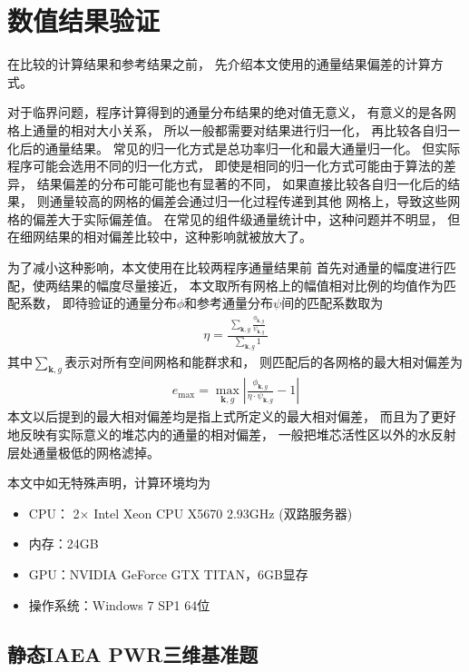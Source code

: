 \section{数值结果验证}

在比较\ProgramName 的计算结果和参考结果之前，
先介绍本文使用的通量结果偏差的计算方式。

对于临界问题，程序计算得到的通量分布结果的绝对值无意义，
有意义的是各网格上通量的相对大小关系，
所以一般都需要对结果进行归一化，
再比较各自归一化后的通量结果。
常见的归一化方式是总功率归一化和最大通量归一化。
但实际程序可能会选用不同的归一化方式，
即使是相同的归一化方式可能由于算法的差异，
结果偏差的分布可能可能也有显著的不同，
如果直接比较各自归一化后的结果，
则通量较高的网格的偏差会通过归一化过程传递到其他
网格上，导致这些网格的偏差大于实际偏差值。
在常见的组件级通量统计中，这种问题并不明显，
但在细网结果的相对偏差比较中，这种影响就被放大了。

为了减小这种影响，本文使用在比较两程序通量结果前
首先对通量的幅度进行匹配，使两结果的幅度尽量接近，
本文取所有网格上的幅值相对比例的均值作为匹配系数，
即待验证的通量分布$\phi$和参考通量分布$\psi$间的匹配系数取为
\begin{align}
  \eta = \frac{\ \displaystyle\sum_{\bm{k},g}\frac{\phi_{\bm{k},g}}{\psi_{\bm{k},g}}\ }
              {\displaystyle\sum_{\bm{k},g}1}
\end{align}
其中$\displaystyle\sum_{\bm{k},g}$表示对所有空间网格和能群求和，
则匹配后的各网格的最大相对偏差为
\begin{align}
  e_\mathrm{max} = \max_{\bm{k},g}
      \left|
        \frac{\phi_{\bm{k},g}}{\eta\cdot\psi_{\bm{k},g}} - 1
      \right|
\end{align}
本文以后提到的最大相对偏差均是指上式所定义的最大相对偏差，
而且为了更好地反映有实际意义的堆芯内的通量的相对偏差，
一般把堆芯活性区以外的水反射层处通量极低的网格滤掉。

本文中如无特殊声明，计算环境均为
\begin{itemize}
\item CPU： 2$\times$ Intel Xeon CPU X5670 2.93GHz (双路服务器)
\item 内存：24GB
\item GPU：NVIDIA GeForce GTX TITAN，6GB显存
\item 操作系统：Windows 7 SP1 64位
\end{itemize}

\subsection{静态IAEA PWR三维基准题}

